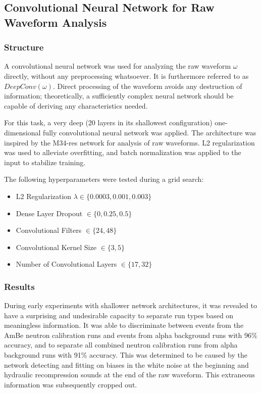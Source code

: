 \documentclass[10pt]{article}
\begin{document}
\subsection{Convolutional Neural Network for Raw Waveform Analysis}

\subsubsection{Structure}

A convolutional neural network was used for analyzing the raw waveform $\omega$ directly, without any preprocessing whatsoever. It is furthermore referred to as $DeepConv(\omega)$. Direct processing of the waveform avoids any destruction of information; theoretically, a sufficiently complex neural network should be capable of deriving any characteristics needed.

For this task, a very deep (20 layers in its shallowest configuration) one-dimensional fully convolutional neural network was applied. The architecture was inspired by the M34-res network \cite{verydeepconvnets} for analysis of raw waveforms. L2 regularization was used to alleviate overfitting, and batch normalization was applied to the input to stabilize training.

The following hyperparameters were tested during a grid search:
\begin{itemize}
    \item L2 Regularization $\lambda \in \{0.0003, 0.001, 0.003\}$
    \item Dense Layer Dropout $\in \{0, 0.25, 0.5\}$
    \item Convolutional Filters $\in \{24, 48\}$
    \item Convolutional Kernel Size $\in \{3, 5\}$
    \item Number of Convolutional Layers $\in \{17, 32\}$
\end{itemize}

\subsubsection{Results}

During early experiments with shallower network architectures, it was revealed to have a surprising and undesirable capacity to separate run types based on meaningless information. It was able to discriminate between events from the AmBe neutron calibration runs and events from alpha background runs with 96\% accuracy, and to separate all combined neutron calibration runs from alpha background runs with 91\% accuracy. This was determined to be caused by the network detecting and fitting on biases in the white noise at the beginning and hydraulic recompression sounds at the end of the raw waveform. This extraneous information was subsequently cropped out.
\end{document}
